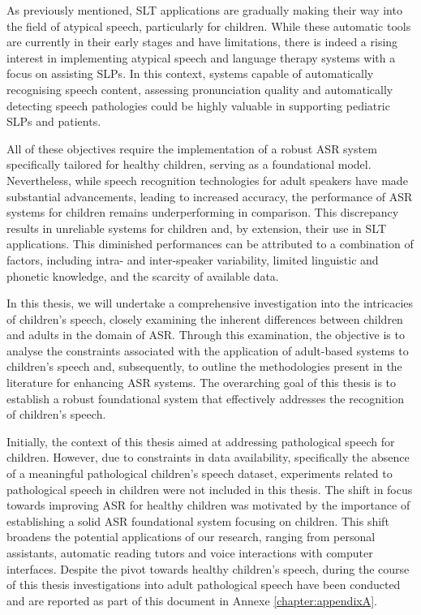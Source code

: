 As previously mentioned, \ac{SLT} applications are gradually making their way into the field of atypical speech, particularly for children. While these automatic tools are currently in their early stages and have limitations, there is indeed a rising interest in implementing atypical speech and language therapy systems with a focus on assisting \acp{SLP}. In this context, systems capable of automatically recognising speech content, assessing pronunciation quality and automatically detecting speech pathologies could be highly valuable in supporting pediatric \acp{SLP} and patients.

All of these objectives require the implementation of a robust \ac{ASR} system specifically tailored for healthy children, serving as a foundational model. Nevertheless, while speech recognition technologies for adult speakers have made substantial advancements, leading to increased accuracy, the performance of \ac{ASR} systems for children remains underperforming in comparison. This discrepancy results in unreliable systems for children and, by extension, their use in \ac{SLT} applications. This diminished performances can be attributed to a combination of factors, including intra- and inter-speaker variability, limited linguistic and phonetic knowledge, and the scarcity of available data.

In this thesis, we will undertake a comprehensive investigation into the intricacies of children's speech, closely examining the inherent differences between children and adults in the domain of \ac{ASR}. Through this examination, the objective is to analyse the constraints associated with the application of adult-based systems to children's speech and, subsequently, to outline the methodologies present in the literature for enhancing \ac{ASR} systems. The overarching goal of this thesis is to establish a robust foundational system that effectively addresses the recognition of children's speech.

Initially, the context of this thesis aimed at addressing pathological speech for children. However, due to constraints in data availability, specifically the absence of a meaningful pathological children's speech dataset, experiments related to pathological speech in children were not included in this thesis. 
The shift in focus towards improving \ac{ASR} for healthy children was motivated by the importance of establishing a solid \ac{ASR} foundational system focusing on children. This shift broadens the potential applications of our research, ranging from personal assistants, automatic reading tutors and voice interactions with computer interfaces. Despite the pivot towards healthy children's speech, during the course of this thesis investigations into adult pathological speech have been conducted and are reported as part of this document in Annexe \ref{chapter:appendixA}.


